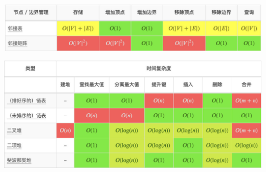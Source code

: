 \documentclass[9pt, b5paaper]{book}
\begin{document}
\includegraphics[width=.9\linewidth]{./pic/bigo4.jpeg}

\includegraphics[width=.9\linewidth]{./pic/bigo5.jpeg}
\end{document}
